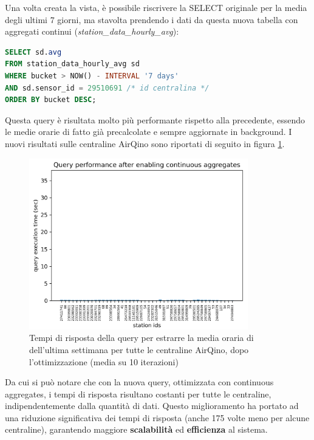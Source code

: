 Una volta creata la vista, è possibile riscrivere la SELECT originale per la media degli ultimi 7 giorni, ma stavolta prendendo i dati da questa nuova tabella con aggregati continui (\textit{station\_data\_hourly\_avg}):
\vspace{1mm}
\begin{lstlisting}[language=sql]
SELECT sd.avg
FROM station_data_hourly_avg sd
WHERE bucket > NOW() - INTERVAL '7 days'
AND sd.sensor_id = 29510691 /* id centralina */
ORDER BY bucket DESC;
\end{lstlisting}

Questa query è risultata molto più performante rispetto alla precedente, essendo le medie orarie di fatto già precalcolate e sempre aggiornate in background. I nuovi risultati sulle centraline AirQino sono riportati di seguito in figura \ref{fig:query-dopo}.

\begin{figure}[H]
\centering
\captionsetup{justification=centering}
\includegraphics[width=0.85\textwidth,height=\textheight,keepaspectratio]{img/query_dopo}
\caption{Tempi di risposta della query per estrarre la media oraria di  dell'ultima settimana per tutte le centraline AirQino, dopo l'ottimizzazione (media su 10 iterazioni)}
\label{fig:query-dopo}
\end{figure}

Da cui si può notare che con la nuova query, ottimizzata con continuous aggregates, i tempi di risposta risultano costanti per tutte le centraline, indipendentemente dalla quantità di dati. Questo miglioramento ha portato ad una riduzione significativa dei tempi di risposta (anche 175 volte meno per alcune centraline), garantendo maggiore \textbf{scalabilità} ed \textbf{efficienza} al sistema.
